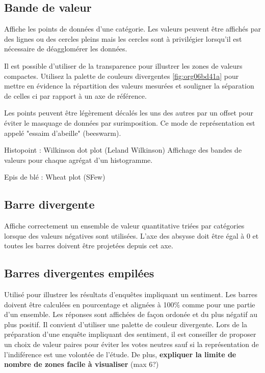 \documentclass[a4paper,12pt]{article}
\begin{document}
\begin{multicols}{2}
\subsection*{Bande de valeur}
\label{sec:orgc561940}
Affiche les points de données d'une catégorie.\autocite{jonathanschwabishDistribution2021} Les valeurs peuvent être affichés par des lignes ou des cercles pleins mais les cercles sont à privilégier lorsqu'il est nécessaire de déagglomérer les données.

Il est possible d'utiliser de la transparence pour illustrer les zones de valeurs compactes. \autocite{jonathanschwabishDistribution2021} Utilisez la palette de couleurs divergentes \ref{fig:org06bd41a} pour mettre en évidence la répartition des valeurs mesurées et souligner la séparation de celles ci par rapport à un axe de référence.\autocite{jonathanschwabishDistribution2021}

Les points peuvent être légèrement décalés les uns des autres par un offset pour éviter le masquage de données par surimposition. Ce mode de représentation est appelé "essaim d'abeille" (beeswarm). \autocite{jonathanschwabishDistribution2021}

Histopoint : Wilkinson dot plot (Leland Wilkinson) Affichage des bandes de valeurs pour chaque agrégat d'un histogramme.\autocite{jonathanschwabishDistribution2021}

Epis de blé : Wheat plot (SFew)
\subsection*{Barre divergente}
\label{sec:orgb3dd0cb}
Affiche correctement un ensemble de valeur quantitative triées par catégories lorsque des valeurs négatives sont utilisées. \autocite{alansmithLexiqueVisuel} L'axe des absysse doit être égal à 0 et toutes les barres doivent être projetées depuis cet axe.
\subsection*{Barres divergentes empilées}
\label{sec:orgadd675f}
Utilisé pour illustrer les résultats d'enquêtes impliquant un sentiment. \autocite{alansmithLexiqueVisuel} Les barres doivent être calculées en pourcentage et alignées à 100\% comme pour une partie d'un ensemble. Les réponses sont affichées de façon ordonée et du plus négatif au plus positif. Il convient d'utiliser une palette de couleur divergente. Lors de la préparation d'une enquête impliquant des sentiment, il est conseiller de proposer un choix de valeur paires pour éviter les votes neutres sauf si la représentation de l'indiférence est une volontée de l'étude. De plus, \textbf{expliquer la limite de nombre de zones facile à visualiser} (max 6?)

\end{multicols}
\end{document}
